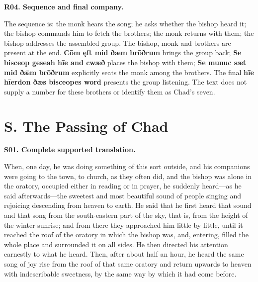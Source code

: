 \par\begin{minipage}{\linewidth}\raggedright
\textbf{R04. Sequence and final company.}

The sequence is: the monk hears the song; he asks whether the bishop heard it; the bishop commands him to fetch the brothers; the monk returns with them; the bishop addresses the assembled group. The bishop, monk and brothers are present at the end. \textbf{Cōm ęft mid ðǣm brōðrum} brings the group back; \textbf{Se bisceop geseah hīe and cwæð} places the bishop with them; \textbf{Se munuc sæt mid ðǣm brōðrum} explicitly seats the monk among the brothers. The final \textbf{hīe hīerdon ðæs bisceopes word} presents the group listening. The text does not supply a number for these brothers or identify them as Chad’s seven.

\end{minipage}\par\addvspace{4pt}

\section*{S. The Passing of Chad}

\textbf{S01. Complete supported translation.}

When, one day, he was doing something of this sort outside, and his companions were going to the town, to church, as they often did, and the bishop was alone in the oratory, occupied either in reading or in prayer, he suddenly heard—as he said afterwards—the sweetest and most beautiful sound of people singing and rejoicing descending from heaven to earth. He said that he first heard that sound and that song from the south-eastern part of the sky, that is, from the height of the winter sunrise; and from there they approached him little by little, until it reached the roof of the oratory in which the bishop was, and, entering, filled the whole place and surrounded it on all sides. He then directed his attention earnestly to what he heard. Then, after about half an hour, he heard the same song of joy rise from the roof of that same oratory and return upwards to heaven with indescribable sweetness, by the same way by which it had come before.

